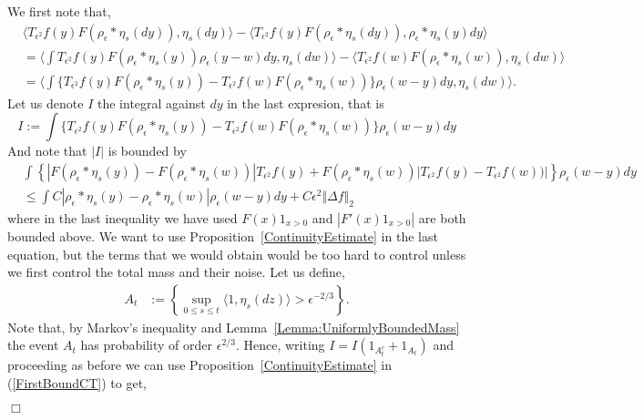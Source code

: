 \documentclass[12pt]{article}
\newenvironment {proof}{{\noindent\bf Proof }}{\hfill $\Box$ \medskip}
\begin{document}
\begin{proof}
We first note that,
\begin{align*}
    &\langle T_{\epsilon^2} f(y) F(\rho_\epsilon *\eta_s(dy)), \eta_s(dy) \rangle - \langle T_{\epsilon^2} f(y) F(\rho_\epsilon * \eta_s(dy)), \rho_\epsilon * \eta_s(y) dy \rangle \\ & = \langle \int T_{\epsilon^2} f(y) F(\rho_\epsilon * \eta_s(y))\rho_\epsilon(y-w) dy, \eta_s(dw)\rangle - \langle T_{\epsilon^2} f(w) F(\rho_\epsilon*\eta_s(w)), \eta_s(dw) \rangle \\ &= \langle \int \{ T_{\epsilon^2} f(y) F(\rho_\epsilon*\eta_s(y))-T_{\epsilon^2}f(w) F(\rho_\epsilon*\eta_s(w))\} \rho_\epsilon(w-y)dy, \eta_s(dw) \rangle.
\end{align*}
Let us denote $I$ the integral against $dy$ in the last expresion, that is 
\[ I :=  \int \{ T_{\epsilon^2} f(y) F(\rho_\epsilon*\eta_s(y))-T_{\epsilon^2}f(w) F(\rho_\epsilon*\eta_s(w))\} \rho_\epsilon(w-y)dy \]
And note that $|I|$ is bounded by
\begin{align}
& \int \left\{ |F(\rho_\epsilon*\eta_s(y))-F(\rho_\epsilon*\eta_s(w))|T_{\epsilon^2}f(y)+F(\rho_\epsilon*\eta_s(w))|T_{\epsilon^2}f(y)-T_{\epsilon^2}f(w))|\right\} \rho_{\epsilon}(w-y)dy \nonumber \\ &\leq \int C |\rho_\epsilon*\eta_s(y)-\rho_\epsilon*\eta_s(w)| \rho_\epsilon(w-y)dy + C \epsilon^2 \Vert \Delta f \Vert_2 \label{FirstBoundCT}
\end{align}
where in the last inequality we have used $F(x)1_{x>0}$ and $|F'(x)1_{x>0}|$ are both bounded above. We want to use Proposition~\ref{ContinuityEstimate} in the last equation, but the terms that we would obtain would be too hard to control unless we first control the total mass and their noise. Let us define,
\begin{align*}
A_{t} &:= \left\{ \sup_{0 \leq s \leq t} \langle 1, \eta_s(dz) \rangle > \epsilon^{-2/3} \right\}. \end{align*}
Note that, by Markov's inequality and Lemma~\ref{Lemma:UniformlyBoundedMass} the event $A_{t}$ has probability of order $\epsilon^{2/3}$. Hence, writing $I = I(1_{A^c_{t}} + 1_{A_{t}})$ and proceeding as before we can use Proposition~\ref{ContinuityEstimate} in (\ref{FirstBoundCT}) to get,
\begin{align}

\end{align}
\end{proof}
\end{document}
